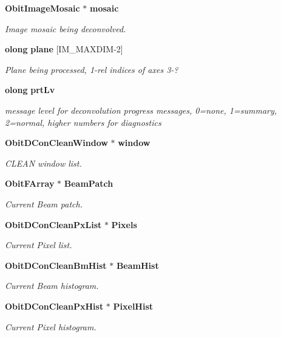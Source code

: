 \begin{CompactItemize}
{\bf Obit\-Image\-Mosaic} $\ast$ {\bf mosaic}
\begin{CompactList}\small\item\em Image mosaic being deconvolved. \item\end{CompactList}\item 
{\bf olong} {\bf plane} [IM\_\-MAXDIM-2]
\begin{CompactList}\small\item\em Plane being processed, 1-rel indices of axes 3-? \item\end{CompactList}\item 
{\bf olong} {\bf prt\-Lv}
\begin{CompactList}\small\item\em message level for deconvolution progress messages, 0=none, 1=summary, 2=normal, higher numbers for diagnostics \item\end{CompactList}\item 
{\bf Obit\-DCon\-Clean\-Window} $\ast$ {\bf window}
\begin{CompactList}\small\item\em CLEAN window list. \item\end{CompactList}\item 
{\bf Obit\-FArray} $\ast$ {\bf Beam\-Patch}
\begin{CompactList}\small\item\em Current Beam patch. \item\end{CompactList}\item 
{\bf Obit\-DCon\-Clean\-Px\-List} $\ast$ {\bf Pixels}
\begin{CompactList}\small\item\em Current Pixel list. \item\end{CompactList}\item 
{\bf Obit\-DCon\-Clean\-Bm\-Hist} $\ast$ {\bf Beam\-Hist}
\begin{CompactList}\small\item\em Current Beam histogram. \item\end{CompactList}\item 
{\bf Obit\-DCon\-Clean\-Px\-Hist} $\ast$ {\bf Pixel\-Hist}
\begin{CompactList}\small\item\em Current Pixel histogram. \item\end{CompactList}\item 

\end{CompactItemize}
